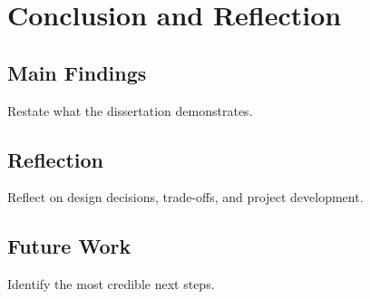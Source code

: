 \chapter{Conclusion and Reflection}

\section{Main Findings}
Restate what the dissertation demonstrates.

\section{Reflection}
Reflect on design decisions, trade-offs, and project development.

\section{Future Work}
Identify the most credible next steps.
